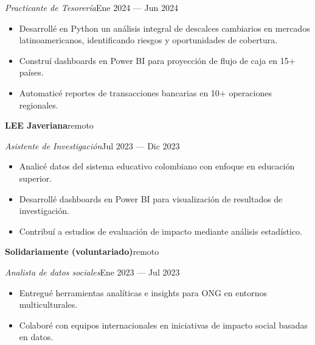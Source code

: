\documentclass[a4paper,10pt]{article}
\newcommand{\headline}[2]{\needspace{3\baselineskip}\textbf{\color{ink}#1}\hfill{\small #2}\par}
\newcommand{\subline}[2]{\textit{#1}\hfill{\small #2}\par}
\begin{document}
\subline{Practicante de Tesorería}{Ene 2024 --- Jun 2024}
\begin{itemize}[leftmargin=1.1em, itemsep=0pt, topsep=1pt, parsep=0pt]
  \item Desarrollé en Python un análisis integral de descalces cambiarios en mercados latinoamericanos, identificando riesgos y oportunidades de cobertura.
  \item Construí dashboards en Power BI para proyección de flujo de caja en 15+ países.
  \item Automaticé reportes de transacciones bancarias en 10+ operaciones regionales.
\end{itemize}
\vspace{4pt}
\headline{LEE Javeriana}{remoto}
\vspace{1pt}
\subline{Asistente de Investigación}{Jul 2023 --- Dic 2023}
\begin{itemize}[leftmargin=1.1em, itemsep=0pt, topsep=1pt, parsep=0pt]
  \item Analicé datos del sistema educativo colombiano con enfoque en educación superior.
  \item Desarrollé dashboards en Power BI para visualización de resultados de investigación.
  \item Contribuí a estudios de evaluación de impacto mediante análisis estadístico.
\end{itemize}
\vspace{4pt}
\headline{Solidariamente (voluntariado)}{remoto}
\vspace{1pt}
\subline{Analista de datos sociales}{Ene 2023 --- Jul 2023}
\begin{itemize}[leftmargin=1.1em, itemsep=0pt, topsep=1pt, parsep=0pt]
  \item Entregué herramientas analíticas e insights para ONG en entornos multiculturales.
  \item Colaboré con equipos internacionales en iniciativas de impacto social basadas en datos.
\end{itemize}
\vspace{4pt}
\end{document}
